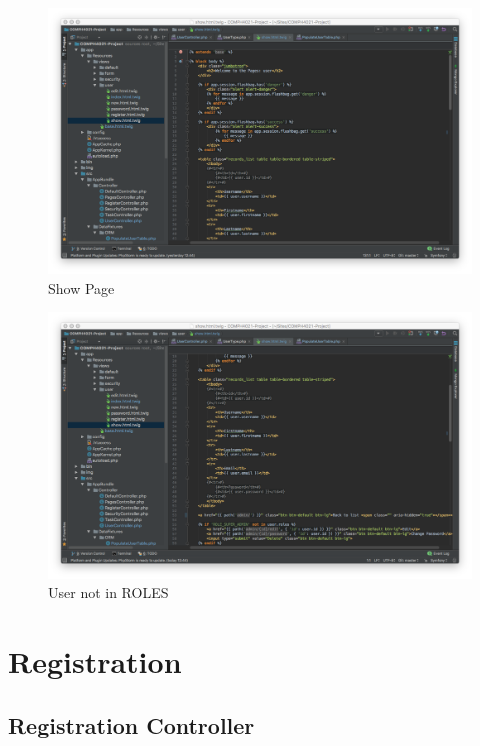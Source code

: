 \begin{figure}[htbp]
   \centering
   \includegraphics[width=400pt]{figures/show_page.png} %
   \caption{Show Page}
   \label{fig:Show Page}
\end{figure}

\begin{figure}[htbp]
   \centering
   \includegraphics[width=400pt]{figures/user_not_in_roles.png} %
   \caption{User not in ROLES}
   \label{fig:User not in ROLES}
\end{figure}

\section{Registration}

\subsection{Registration Controller}


